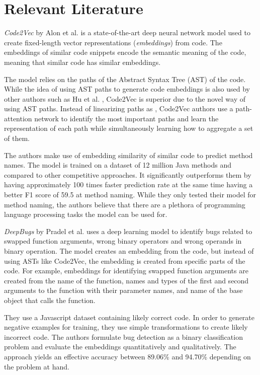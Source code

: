 \section{Relevant Literature} \label{sec:relevant_literature}
\textit{Code2Vec} by Alon et al. \cite{alon2019code2vec} is a state-of-the-art deep neural network model used to create fixed-length vector representations (\textit{embeddings}) from code. The embeddings of similar code snippets encode the semantic meaning of the code, meaning that similar code has similar embeddings. 

The model relies on the paths of the Abstract Syntax Tree (AST) of the code. While the idea of using AST paths to generate code embeddings is also used by other authors such as Hu et al. \cite{hu2018deep}, Code2Vec is superior due to the novel way of using AST paths. Instead of linearizing paths as \cite{hu2018deep}, Code2Vec authors use a path-attention network to identify the most important paths and learn the representation of each path while simultaneously learning how to aggregate a set of them.

The authors make use of embedding similarity of similar code to predict method names. The model is trained on a dataset of 12 million Java methods and compared to other competitive approaches. It significantly outperforms them by having approximately 100 times faster prediction rate at the same time having a better F1 score of 59.5 at method naming. While they only tested their model for method naming, the authors believe that there are a plethora of programming language processing tasks the model can be used for.

\textit{DeepBugs} by Pradel et al. \cite{pradel2018deepbugs} uses a deep learning model to identify bugs related to swapped function arguments, wrong binary operators and wrong operands in binary operation. The model creates an embedding from the code, but instead of using ASTs like Code2Vec, the embedding is created from specific parts of the code. For example, embeddings for identifying swapped function arguments are created from the name of the function, names and types of the first and second arguments to the function with their parameter names, and name of the base object that calls the function.

They use a Javascript dataset containing likely correct code. In order to generate negative examples for training, they use simple transformations to create likely incorrect code. The authors formulate bug detection as a binary classification problem and evaluate the embeddings quantitatively and qualitatively. The approach yields an effective accuracy between 89.06\% and 94.70\% depending on the problem at hand.